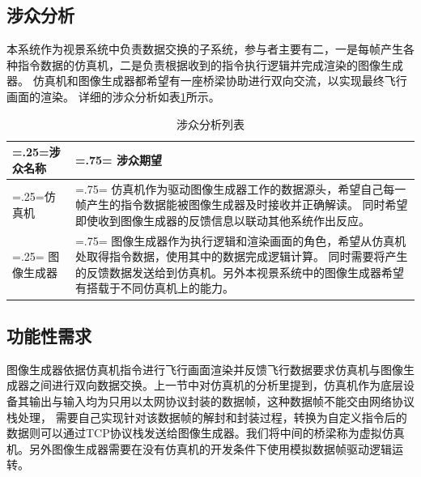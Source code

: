 \subsection{涉众分析}
本系统作为视景系统中负责数据交换的子系统，参与者主要有二，一是每帧产生各种指令数据的仿真机，二是负责根据收到的指令执行逻辑并完成渲染的图像生成器。
仿真机和图像生成器都希望有一座桥梁协助进行双向交流，以实现最终飞行画面的渲染。
详细的涉众分析如表\ref{stakeholder}所示。
\begin{table}[h!]
    \begin{center}
        \caption{涉众分析列表}
        \label{stakeholder}
        \renewcommand\arraystretch{1.5}
        \begin{tabularx}{\textwidth}{ 
            | >{\centering\arraybackslash\hsize=.25\hsize\linewidth=\hsize}X 
            | >{\raggedright\arraybackslash\hsize=.75\hsize\linewidth=\hsize}X 
            | }
            \hline
            \textbf{涉众名称} & \textbf{涉众期望}\\
            \hline
            仿真机 &      仿真机作为驱动图像生成器工作的数据源头，希望自己每一帧产生的指令数据能被图像生成器及时接收并正确解读。
                          同时希望即使收到图像生成器的反馈信息以联动其他系统作出反应。\\
            \hline
            图像生成器 &  图像生成器作为执行逻辑和渲染画面的角色，希望从仿真机处取得指令数据，使用其中的数据完成逻辑计算。
                         同时需要将产生的反馈数据发送给到仿真机。另外本视景系统中的图像生成器希望有搭载于不同仿真机上的能力。\\
            \hline
        \end{tabularx}
    \end{center}
\end{table}
\subsection{功能性需求}
图像生成器依据仿真机指令进行飞行画面渲染并反馈飞行数据要求仿真机与图像生成器之间进行双向数据交换。上一节中对仿真机的分析里提到，仿真机作为底层设备其输出与输入均为只用以太网协议封装的数据帧，这种数据帧不能交由网络协议栈处理，
需要自己实现针对该数据帧的解封和封装过程，转换为自定义指令后的数据则可以通过TCP协议栈发送给图像生成器。我们将中间的桥梁称为虚拟仿真机。另外图像生成器需要在没有仿真机的开发条件下使用模拟数据帧驱动逻辑运转。

